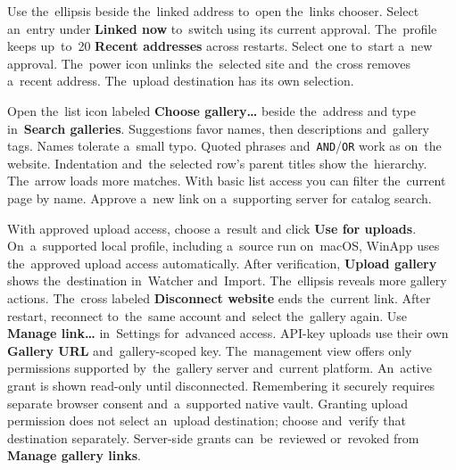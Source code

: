\documentclass[11pt,a4paper]{article}
\newcommand{\ui}[1]{\textbf{#1}}
\begin{document}
Use the~ellipsis beside the~linked address to~open the~links chooser.
Select an~entry under \ui{Linked now} to~switch using its current approval.
The~profile keeps up~to~20 \ui{Recent addresses} across restarts. Select one
to~start a~new approval. The~power icon unlinks the~selected site and~the
cross removes a~recent address. The~upload destination has its own selection.

Open the~list icon labeled \ui{Choose gallery…} beside the~address and type
in~\ui{Search galleries}.
Suggestions favor names, then descriptions and~gallery tags. Names tolerate
a~small typo. Quoted phrases and~\texttt{AND}/\texttt{OR} work as on~the website.
Indentation and~the selected row's parent titles show the~hierarchy.
The~arrow loads more matches. With basic list access you can filter the~current
page by name. Approve a~new link on a~supporting server for catalog search.

With approved upload access, choose a~result and click \ui{Use for uploads}.
On~a~supported local profile,
including a~source run on~macOS, WinApp uses the~approved upload access
automatically. After verification,
\ui{Upload gallery} shows the~destination in~Watcher and~Import. The~ellipsis
reveals more gallery actions. The~cross labeled \ui{Disconnect website}
ends the~current link.
After restart, reconnect to~the~same account and~select the~gallery again.
Use \ui{Manage link…} in~Settings for~advanced access. API-key uploads use
their own \ui{Gallery URL} and~gallery-scoped key.
The~management view offers only permissions supported by~the~gallery server
and~current platform. An~active grant is shown read-only until disconnected.
Remembering it securely requires separate browser consent and~a~supported
native vault. Granting upload permission does not select an~upload destination;
choose and~verify that destination separately. Server-side grants can~be~reviewed
or~revoked from \ui{Manage gallery links}.
\end{document}
